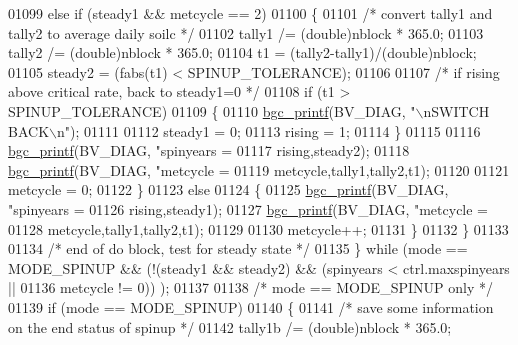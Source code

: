 \begin{DoxyCode}
{{{{{{{{{{{{{{{{{{{{{{{{{{{{{{{{{{{{{{{{{{{{{{{{{{01099         \textcolor{keywordflow}{else} \textcolor{keywordflow}{if} (steady1 && metcycle == 2)
01100         \{
01101             \textcolor{comment}{/* convert tally1 and tally2 to average daily soilc */}
01102             tally1 /= (double)nblock * 365.0;
01103             tally2 /= (double)nblock * 365.0;
01104             t1 = (tally2-tally1)/(\textcolor{keywordtype}{double})nblock;
01105             steady2 = (fabs(t1) < SPINUP\_TOLERANCE);
01106 
01107             \textcolor{comment}{/* if rising above critical rate, back to steady1=0 */}
01108             \textcolor{keywordflow}{if} (t1 > SPINUP\_TOLERANCE)
01109             \{
01110                 \hyperlink{bgc__io_8c_af287cce6e2aede1ce337de9319e80d0d}{bgc\_printf}(BV\_DIAG, \textcolor{stringliteral}{"\(\backslash\)nSWITCH BACK\(\backslash\)n"});
01111 
01112                 steady1 = 0;
01113                 rising = 1;
01114             \}
01115 
01116             \hyperlink{bgc__io_8c_af287cce6e2aede1ce337de9319e80d0d}{bgc\_printf}(BV\_DIAG, \textcolor{stringliteral}{"spinyears = %
01117                 rising,steady2);
01118             \hyperlink{bgc__io_8c_af287cce6e2aede1ce337de9319e80d0d}{bgc\_printf}(BV\_DIAG, \textcolor{stringliteral}{"metcycle = %
01119                 metcycle,tally1,tally2,t1);
01120 
01121             metcycle = 0;
01122         \}
01123         \textcolor{keywordflow}{else}
01124         \{
01125             \hyperlink{bgc__io_8c_af287cce6e2aede1ce337de9319e80d0d}{bgc\_printf}(BV\_DIAG, \textcolor{stringliteral}{"spinyears = %
01126                 rising,steady1);
01127             \hyperlink{bgc__io_8c_af287cce6e2aede1ce337de9319e80d0d}{bgc\_printf}(BV\_DIAG, \textcolor{stringliteral}{"metcycle = %
01128                 metcycle,tally1,tally2,t1);
01129 
01130             metcycle++;
01131         \}
01132     \}
01133 
01134     \textcolor{comment}{/* end of do block, test for steady state */}
01135     \} \textcolor{keywordflow}{while} (mode == MODE\_SPINUP && (!(steady1 && steady2) && (spinyears < ctrl.maxspinyears ||
01136         metcycle != 0)) );
01137 
01138     \textcolor{comment}{/* mode == MODE\_SPINUP only */}
01139     \textcolor{keywordflow}{if} (mode == MODE\_SPINUP)
01140     \{
01141         \textcolor{comment}{/* save some information on the end status of spinup */}
01142         tally1b /= (double)nblock * 365.0;
}}}}}}}}}}}}}}}}}}}}}}}}}}}}}}}}}}}}}}}}}}}}}}}}}}}}}}
\end{DoxyCode}
